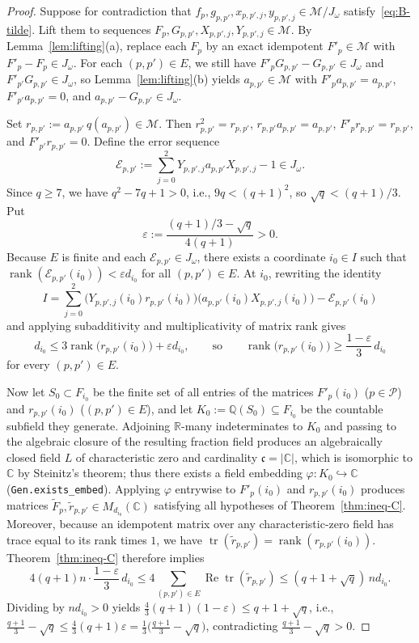 \documentclass[11pt]{article}
\theoremstyle{definition}
\theoremstyle{remark}
\numberwithin{equation}{section}
\DeclareMathOperator{\rank}{rank}
\DeclareMathOperator{\tr}{tr}
\DeclareMathOperator{\RePart}{Re}
\newcommand{\Q}{\mathbb{Q}}
\newcommand{\R}{\mathbb{R}}
\newcommand{\C}{\mathbb{C}}
\newcommand{\PP}{\mathcal{P}}
\newcommand{\1}{\mathbf{1}}
\newcommand{\code}[1]{{\normalfont\small\texttt{#1}}}
\begin{document}
\begin{proof}
Suppose for contradiction that $f_p, g_{p,p'}, x_{p,p',j}, y_{p,p',j} \in \mathcal{M}/J_\omega$ satisfy~\eqref{eq:B-tilde}. Lift them to sequences $F_p, G_{p,p'}, X_{p,p',j}, Y_{p,p',j} \in \mathcal{M}$. By Lemma~\ref{lem:lifting}(a), replace each $F_p$ by an exact idempotent $F'_p \in \mathcal{M}$ with $F'_p - F_p \in J_\omega$. For each $(p, p') \in E$, we still have $F'_p G_{p,p'} - G_{p,p'} \in J_\omega$ and $F'_{p'} G_{p,p'} \in J_\omega$, so Lemma~\ref{lem:lifting}(b) yields $a_{p,p'} \in \mathcal{M}$ with $F'_p a_{p,p'} = a_{p,p'}$, $F'_{p'} a_{p,p'} = 0$, and $a_{p,p'} - G_{p,p'} \in J_\omega$.

Set $r_{p,p'} := a_{p,p'}\, q(a_{p,p'}) \in \mathcal{M}$. Then $r_{p,p'}^2 = r_{p,p'}$, $r_{p,p'} a_{p,p'} = a_{p,p'}$, $F'_p r_{p,p'} = r_{p,p'}$, and $F'_{p'} r_{p,p'} = 0$. Define the error sequence
\[
\mathcal{E}_{p,p'} := \sum_{j=0}^{2} Y_{p,p',j} a_{p,p'} X_{p,p',j} - 1 \in J_\omega.
\]
Since $q \ge 7$, we have $q^2 - 7q + 1 > 0$, i.e., $9q < (q+1)^2$, so $\sqrt{q} < (q+1)/3$. Put
\[
\varepsilon := \frac{(q + 1)/3 - \sqrt{q}}{4(q + 1)} > 0.
\]
Because $E$ is finite and each $\mathcal{E}_{p,p'} \in J_\omega$, there exists a coordinate $i_0 \in I$ such that $\rank(\mathcal{E}_{p,p'}(i_0)) < \varepsilon d_{i_0}$ for all $(p, p') \in E$. At $i_0$, rewriting the identity
\[
I = \sum_{j=0}^2 \bigl(Y_{p,p',j}(i_0) r_{p,p'}(i_0)\bigr)\bigl(a_{p,p'}(i_0) X_{p,p',j}(i_0)\bigr) - \mathcal{E}_{p,p'}(i_0)
\]
and applying subadditivity and multiplicativity of matrix rank gives
\[
d_{i_0} \le 3\rank\bigl(r_{p,p'}(i_0)\bigr) + \varepsilon d_{i_0},
\qquad\text{so}\qquad
\rank\bigl(r_{p,p'}(i_0)\bigr) \ge \frac{1 - \varepsilon}{3}\, d_{i_0}
\]
for every $(p, p') \in E$.

Now let $S_0 \subset F_{i_0}$ be the finite set of all entries of the matrices $F'_p(i_0)$ ($p \in \PP$) and $r_{p,p'}(i_0)$ ($(p,p') \in E$), and let $K_0 := \Q(S_0) \subseteq F_{i_0}$ be the countable subfield they generate. Adjoining $\R$-many indeterminates to $K_0$ and passing to the algebraic closure of the resulting fraction field produces an algebraically closed field $L$ of characteristic zero and cardinality $\mathfrak{c} = |\C|$, which is isomorphic to $\C$ by Steinitz's theorem; thus there exists a field embedding $\varphi\colon K_0 \hookrightarrow \C$ (\code{Gen.exists\_embed}). Applying $\varphi$ entrywise to $F'_p(i_0)$ and $r_{p,p'}(i_0)$ produces matrices $\widetilde{F}_p, \widetilde{r}_{p,p'} \in M_{d_{i_0}}(\C)$ satisfying all hypotheses of Theorem~\ref{thm:ineq-C}. Moreover, because an idempotent matrix over any characteristic-zero field has trace equal to its rank times $1$, we have $\tr(\widetilde{r}_{p,p'}) = \rank(r_{p,p'}(i_0))$. Theorem~\ref{thm:ineq-C} therefore implies
\[
4(q + 1) n \cdot \frac{1 - \varepsilon}{3}\, d_{i_0}
\le 4\sum_{(p, p') \in E} \RePart\tr(\widetilde{r}_{p,p'})
\le (q + 1 + \sqrt{q})\, n d_{i_0}.
\]
Dividing by $n d_{i_0} > 0$ yields $\frac{4}{3}(q + 1)(1 - \varepsilon) \le q + 1 + \sqrt{q}$, i.e., $\frac{q+1}{3} - \sqrt{q} \le \frac{4}{3}(q+1)\varepsilon = \frac{1}{3}\bigl(\frac{q+1}{3} - \sqrt{q}\bigr)$, contradicting $\frac{q+1}{3} - \sqrt{q} > 0$.
\end{proof}
\end{document}
